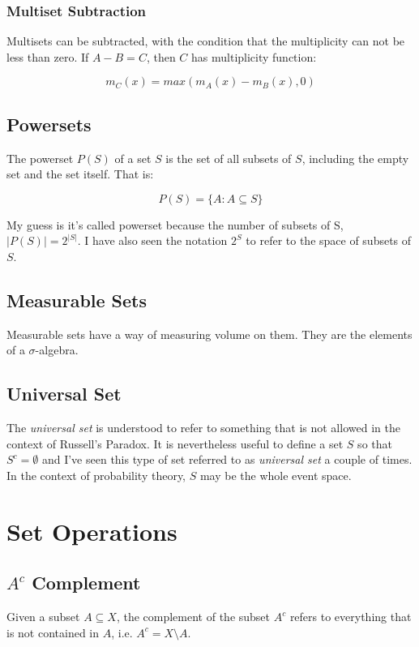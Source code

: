 \subsubsection{Multiset Subtraction}
Multisets can be subtracted, with the condition that the multiplicity can not be less than zero. If $A- B = C$, then $C$ has multiplicity function:

\begin{equation}
m_C(x) = max\left(m_A(x) - m_B(x), 0\right)
\end{equation}

\subsection{Powersets}
The powerset $P(S)$ of a set $S$ is the set of all subsets of $S$, including the empty set and the set itself. That is:

\begin{equation}
P(S) = \{ A : A\subseteq S\}
\end{equation}

My guess is it's called powerset because the number of subsets of S, $|P(S)| = 2^{|S|}$. I have also seen the notation $2^S$ to refer to the space of subsets of $S$.



\subsection{Measurable Sets}
Measurable sets have a way of measuring volume on them. They are the elements of a $\sigma$-algebra. 

\subsection{Universal Set}
The \textit{universal set} is understood to refer to something that is not allowed in the context of Russell's Paradox. It is nevertheless useful to define a set $S$ so that $S^c = \emptyset$ and I've seen this type of set referred to as \textit{universal set} a couple of times. In the context of probability theory, $S$ may be the whole event space.


\section{Set Operations}

\subsection{$A^c$ Complement}
Given a subset $A \subseteq X$, the complement of the subset $A^c$ refers to everything that is not contained in $A$, i.e. $A^c = X\setminus A$. 


